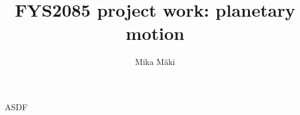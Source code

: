 \documentclass[a4paper]{article}
\title{FYS2085 project work: planetary motion}
\author{Mika Mäki}
\begin{document}
ASDF
\end{document}
